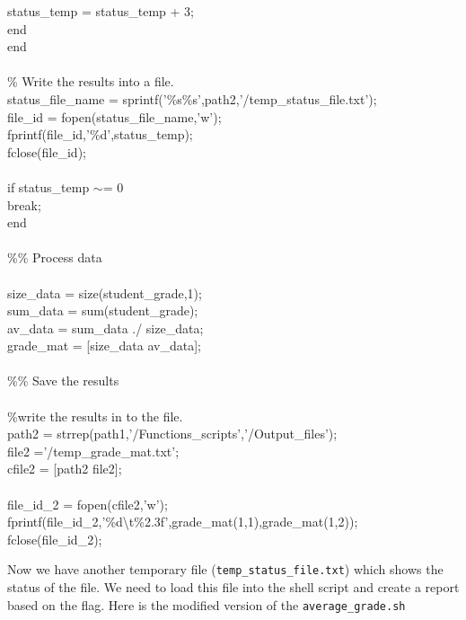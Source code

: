 \begin{mdframed}[hidealllines=true,backgroundcolor=gray!20]
\begin{singlespace}
{\phantom{x}\hspace{10ex} status\_temp = status\_temp + 3;\\
\phantom{x}\hspace{5ex} {\color{for_blue}end}\\
{\color{for_blue}end}\\
\\
{\color{matlab_green}\% Write the results into a file.}\\
status\_file\_name = sprintf({\color{matlab_pink}'\%s\%s'},path2,{\color{matlab_pink}'/temp\_status\_file.txt'});\\
file\_id = fopen(status\_file\_name,{\color{matlab_pink}'w'});\\
fprintf(file\_id,{\color{matlab_pink}'\%d'},status\_temp);\\
fclose(file\_id);\\
\\
{\color{for_blue}if} status\_temp $\sim$= 0\\
\phantom{x}\hspace{5ex} {\color{for_blue}break};\\
{\color{for_blue}end}\\
\\
{ \color{matlab_green}\%\% Process data}\\
\\
size\_data = size(student\_grade,1);\\
sum\_data = sum(student\_grade);\\
av\_data = sum\_data ./ size\_data;\\
grade\_mat = [size\_data av\_data];\\
\\
{ \color{matlab_green}\%\% Save the results}\\
\\
{ \color{matlab_green}\%write the results in to the file.} \\
path2 = strrep(path1,{\color{matlab_pink}'/Functions\_scripts'},{\color{matlab_pink}'/Output\_files'});\\ 
file2 ={\color{matlab_pink}'/temp\_grade\_mat.txt'};\\
cfile2 = [path2 file2];\\
\\
file\_id\_2 = fopen(cfile2,'w');\\
fprintf(file\_id\_2,{\color{matlab_pink}'\%d\textbackslash t\%2.3f'},grade\_mat(1,1),grade\_mat(1,2));\\
fclose(file\_id\_2);
}
\end{singlespace}
\end{mdframed}
\noindent
Now we have another temporary file (\texttt{temp\_status\_file.txt}) which shows the status of the file. We need to load this file into the shell script and create a report based on the flag. Here is the modified version of the \texttt{average\_grade.sh} 






